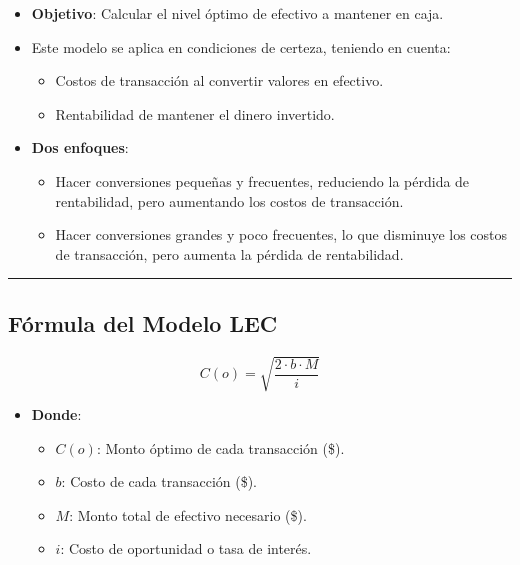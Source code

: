 \documentclass[
  letterpaper,
  DIV=11,
  numbers=noendperiod]{scrartcl}
\providecommand{\tightlist}{%
  \setlength{\itemsep}{0pt}\setlength{\parskip}{0pt}}\usepackage{longtable,booktabs,array}
\begin{document}
\begin{itemize}
\tightlist
\item
  \textbf{Objetivo}: Calcular el nivel óptimo de efectivo a mantener en
  caja.
\item
  Este modelo se aplica en condiciones de certeza, teniendo en cuenta:

  \begin{itemize}
  \tightlist
  \item
    Costos de transacción al convertir valores en efectivo.
  \item
    Rentabilidad de mantener el dinero invertido.
  \end{itemize}
\item
  \textbf{Dos enfoques}:

  \begin{itemize}
  \tightlist
  \item
    Hacer conversiones pequeñas y frecuentes, reduciendo la pérdida de
    rentabilidad, pero aumentando los costos de transacción.
  \item
    Hacer conversiones grandes y poco frecuentes, lo que disminuye los
    costos de transacción, pero aumenta la pérdida de rentabilidad.
  \end{itemize}
\end{itemize}

\begin{center}\rule{0.5\linewidth}{0.5pt}\end{center}

\subsection{Fórmula del Modelo LEC}\label{fuxf3rmula-del-modelo-lec}

\[
C(o) = \sqrt{\frac{2 \cdot b \cdot M}{i}}
\]

\begin{itemize}
\tightlist
\item
  \textbf{Donde}:

  \begin{itemize}
  \tightlist
  \item
    \(C(o)\): Monto óptimo de cada transacción (\$).
  \item
    \(b\): Costo de cada transacción (\$).
  \item
    \(M\): Monto total de efectivo necesario (\$).
  \item
    \(i\): Costo de oportunidad o tasa de interés.
  \end{itemize}
\end{itemize}
\end{document}
